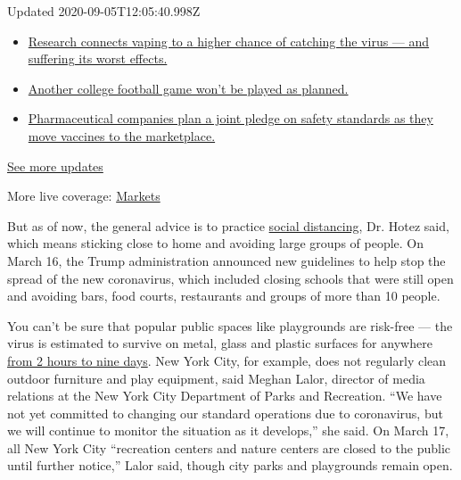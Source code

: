Updated 2020-09-05T12:05:40.998Z

\begin{itemize}
\tightlist
\item
  \href{https://www.nytimes3xbfgragh.onion/2020/09/04/world/covid-19-coronavirus.html?action=click\&pgtype=Article\&state=default\&region=MAIN_CONTENT_1\&context=storylines_live_updates\#link-1654f6ad}{Research
  connects vaping to a higher chance of catching the virus --- and
  suffering its worst effects.}
\item
  \href{https://www.nytimes3xbfgragh.onion/2020/09/04/world/covid-19-coronavirus.html?action=click\&pgtype=Article\&state=default\&region=MAIN_CONTENT_1\&context=storylines_live_updates\#link-52e4198a}{Another
  college football game won't be played as planned.}
\item
  \href{https://www.nytimes3xbfgragh.onion/2020/09/04/world/covid-19-coronavirus.html?action=click\&pgtype=Article\&state=default\&region=MAIN_CONTENT_1\&context=storylines_live_updates\#link-181cef0}{Pharmaceutical
  companies plan a joint pledge on safety standards as they move
  vaccines to the marketplace.}
\end{itemize}

\href{https://www.nytimes3xbfgragh.onion/2020/09/04/world/covid-19-coronavirus.html?action=click\&pgtype=Article\&state=default\&region=MAIN_CONTENT_1\&context=storylines_live_updates}{See
more updates}

More live coverage:
\href{https://www.nytimes3xbfgragh.onion/live/2020/09/04/business/stock-market-today-coronavirus?action=click\&pgtype=Article\&state=default\&region=MAIN_CONTENT_1\&context=storylines_live_updates}{Markets}

But as of now, the general advice is to practice
\href{https://www.cdc.gov/nonpharmaceutical-interventions/community/index.html}{social
distancing}, Dr. Hotez said, which means sticking close to home and
avoiding large groups of people. On March 16, the Trump administration
announced new guidelines to help stop the spread of the new coronavirus,
which included closing schools that were still open and avoiding bars,
food courts, restaurants and groups of more than 10 people.

You can't be sure that popular public spaces like playgrounds are
risk-free --- the virus is estimated to survive on metal, glass and
plastic surfaces for anywhere
\href{https://www.nytimes3xbfgragh.onion/2020/03/02/health/coronavirus-how-it-spreads.html}{from
2 hours to nine days}. New York City, for example, does not regularly
clean outdoor furniture and play equipment, said Meghan Lalor, director
of media relations at the New York City Department of Parks and
Recreation. ``We have not yet committed to changing our standard
operations due to coronavirus, but we will continue to monitor the
situation as it develops,'' she said. On March 17, all New York City
``recreation centers and nature centers are closed to the public until
further notice,'' Lalor said, though city parks and playgrounds remain
open.

